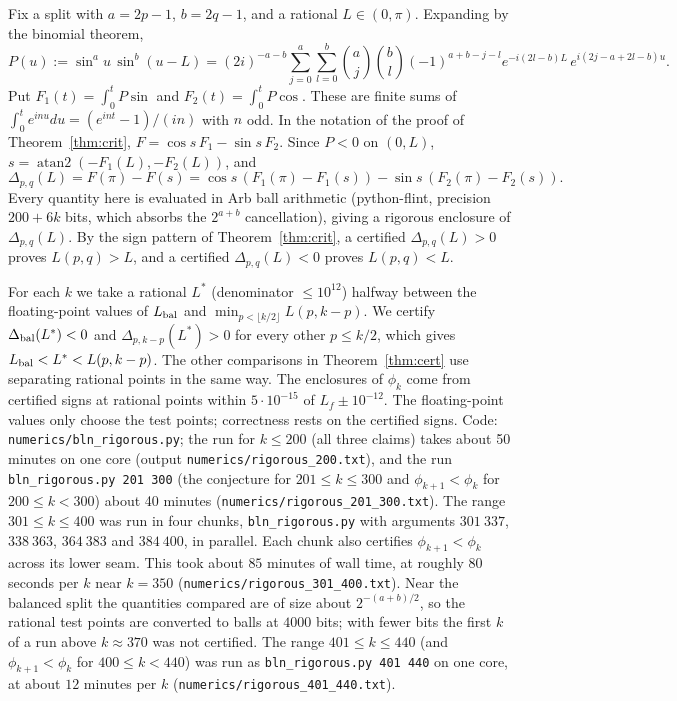 \documentclass[11pt]{amsart}
\theoremstyle{definition}
\begin{document}
Fix a split with $a=2p-1$, $b=2q-1$, and a rational $L\in(0,\pi)$. Expanding by the binomial theorem,
\[
P(u):=\sin^au\,\sin^b(u-L)=(2i)^{-a-b}\sum_{j=0}^a\sum_{l=0}^b\binom aj\binom bl(-1)^{a+b-j-l}e^{-i(2l-b)L}\,e^{i(2j-a+2l-b)u}.
\]
Put $F_1(t)=\int_0^tP\sin$ and $F_2(t)=\int_0^tP\cos$. These are finite sums of $\int_0^te^{inu}du=(e^{int}-1)/(in)$ with $n$ odd.
In the notation of the proof of Theorem~\ref{thm:crit}, $F=\cos s\,F_1-\sin s\,F_2$. Since $P<0$ on $(0,L)$,
$s=\operatorname{atan2}(-F_1(L),-F_2(L))$, and
\[
\Delta_{p,q}(L)=F(\pi)-F(s)=\cos s\,(F_1(\pi)-F_1(s))-\sin s\,(F_2(\pi)-F_2(s)).
\]
Every quantity here is evaluated in Arb ball arithmetic (python-flint, precision $200+6k$ bits, which absorbs the $2^{a+b}$ cancellation),
giving a rigorous enclosure of $\Delta_{p,q}(L)$. By the sign pattern of Theorem~\ref{thm:crit}, a certified $\Delta_{p,q}(L)>0$ proves
$L(p,q)>L$, and a certified $\Delta_{p,q}(L)<0$ proves $L(p,q)<L$.

For each $k$ we take a rational $L^*$ (denominator $\le10^{12}$) halfway between the floating-point values of $L_{\rm bal}$ and
$\min_{p<\lfloor k/2\rfloor}L(p,k-p)$. We certify $\Delta_{\rm bal}(L^*)<0$ and $\Delta_{p,k-p}(L^*)>0$ for every other $p\le k/2$, which gives
$L_{\rm bal}<L^*<L(p,k-p)$. The other comparisons in Theorem~\ref{thm:cert} use separating rational points in the same way. The
enclosures of $\phi_k$ come from certified signs at rational points within $5\cdot10^{-15}$ of $L_f\pm10^{-12}$. The floating-point values only choose the test points; correctness
rests on the certified signs. Code: \texttt{numerics/bln\_rigorous.py}; the run for $k\le200$ (all three claims) takes about 50 minutes on one core (output \texttt{numerics/rigorous\_200.txt}), and the run
\texttt{bln\_rigorous.py 201 300} (the conjecture for $201\le k\le300$ and $\phi_{k+1}<\phi_k$ for $200\le k<300$) about 40 minutes (\texttt{numerics/rigorous\_201\_300.txt}).
The range $301\le k\le400$ was run in four chunks, \texttt{bln\_rigorous.py} with arguments $301\ 337$, $338\ 363$, $364\ 383$ and $384\ 400$, in parallel.
Each chunk also certifies $\phi_{k+1}<\phi_k$ across its lower seam. This took about $85$ minutes of wall time, at roughly $80$ seconds per $k$ near
$k=350$ (\texttt{numerics/rigorous\_301\_400.txt}). Near the balanced split the quantities compared are of size about $2^{-(a+b)/2}$, so the rational test
points are converted to balls at $4000$ bits; with fewer bits the first $k$ of a run above $k\approx370$ was not certified.
The range $401\le k\le440$ (and $\phi_{k+1}<\phi_k$ for $400\le k<440$) was run as \texttt{bln\_rigorous.py 401 440} on one core, at about $12$ minutes per $k$
(\texttt{numerics/rigorous\_401\_440.txt}).
\end{document}
